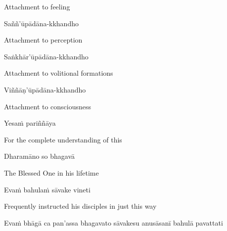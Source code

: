 \begin{english}
  Attachment to feeling
\end{english}

Saññ'ūpādāna-kkhandho

\begin{english}
  Attachment to perception
\end{english}

Saṅkhār'ūpādāna-kkhandho

\begin{english}
  Attachment to volitional formations\makeatletter\hyperlink{endnote16-appendix}\makeatother
\end{english}

Viññāṇ'ūpādāna-kkhandho

\begin{english}
  Attachment to consciousness\makeatletter\hyperlink{endnote17-appendix}\makeatother
\end{english}

\suttaRef{[DN 22]}

Yesaṁ pariññāya

\begin{english}
  For the complete understanding of this
\end{english}

Dharamāno so bhagavā

\begin{english}
  The Blessed One in his lifetime
\end{english}

Evaṁ bahulaṁ sāvake vineti

\begin{english}
  Frequently instructed his disciples in just this way
\end{english}

\begin{pali-hang}
  Evaṁ bhāgā ca pan'assa bhagavato sāvakesu anusāsanī bahulā pavattati
\end{pali-hang}

